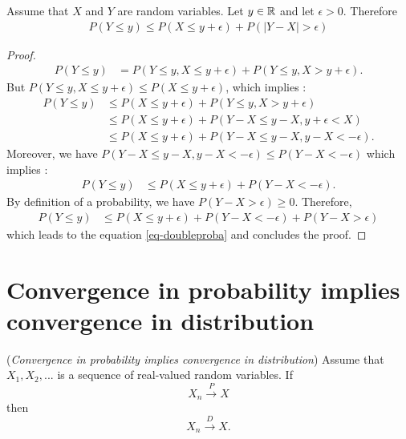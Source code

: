 \documentclass{article}
\begin{document}
\begin{theorem}
\label{theo-doubleproba}
Assume that $X$ and $Y$ are random variables. 
Let $y\in\mathbb{R}$ and let $\epsilon>0$. 
Therefore
\begin{align}
\label{eq-doubleproba}
P(Y\leq y) \leq P(X\leq y+\epsilon) + P(|Y-X|> \epsilon)
\end{align}
\end{theorem}

\begin{proof}
\begin{align*}
P(Y\leq y)
& = P(Y\leq y,X\leq y+\epsilon)+P(Y\leq y,X> y+\epsilon).
\end{align*}
But $P(Y\leq y,X\leq y+\epsilon) \leq P(X\leq y+\epsilon)$, which implies :
\begin{align*}
P(Y\leq y)
& \leq P(X\leq y+\epsilon)+P(Y\leq y,X> y+\epsilon) \\
& \leq P(X\leq y+\epsilon)+P(Y-X\leq y-X, y+\epsilon<X) \\
& \leq P(X\leq y+\epsilon)+P(Y-X\leq y-X, y-X <-\epsilon).
\end{align*}
Moreover, we have $P(Y-X\leq y-X, y-X <-\epsilon)\leq P(Y-X<-\epsilon)$ which implies : 
\begin{align*}
P(Y\leq y)
& \leq P(X\leq y+\epsilon)+P(Y-X<-\epsilon).
\end{align*}
By definition of a probability, we have $P(Y-X>\epsilon)\geq 0$. 
Therefore, 
\begin{align*}
P(Y\leq y)
& \leq P(X\leq y+\epsilon)+P(Y-X<-\epsilon) + P(Y-X>\epsilon)
\end{align*}
which leads to the equation \ref{eq-doubleproba} and concludes the proof.
\end{proof}


\section{Convergence in probability implies convergence in distribution}

\begin{theorem}
\label{theo-convprovdist}
(\emph{Convergence in probability implies convergence in distribution})
Assume that $X_1,X_2,...$ is a sequence of real-valued random variables. 
If 
$$
X_n \xrightarrow{P} X
$$
then
$$
X_n \xrightarrow{D} X.
$$
\end{theorem}
\end{document}
